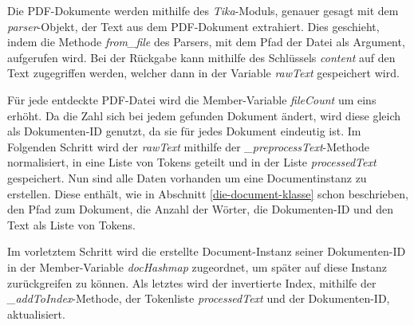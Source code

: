  Die PDF-Dokumente werden mithilfe des \textit{Tika}-Moduls, genauer gesagt mit dem \textit{parser}-Objekt, der Text aus dem PDF-Dokument extrahiert. Dies geschieht, indem die Methode \textit{from\_file} des Parsers, mit dem Pfad der Datei als Argument, aufgerufen wird. Bei der Rückgabe kann mithilfe des Schlüssels \textit{content} auf den Text zugegriffen werden, welcher dann in der Variable \textit{rawText} gespeichert wird.

Für jede entdeckte PDF-Datei wird die Member-Variable \textit{fileCount} um eins erhöht. Da die Zahl sich bei jedem gefunden Dokument ändert, wird diese gleich als Dokumenten-ID genutzt, da sie für jedes Dokument eindeutig ist. Im Folgenden Schritt wird der \textit{rawText} mithilfe der \textit{\_preprocessText}-Methode normalisiert, in eine Liste von Tokens geteilt und in der Liste \textit{processedText} gespeichert. Nun sind alle Daten vorhanden um eine Documentinstanz zu erstellen. Diese enthält, wie in Abschnitt \ref{die-document-klasse} schon beschrieben, den Pfad zum Dokument, die Anzahl der Wörter, die Dokumenten-ID und den Text als Liste von Tokens.

Im vorletztem Schritt wird die erstellte Document-Instanz seiner Dokumenten-ID in der Member-Variable \textit{docHashmap} zugeordnet, um später auf diese Instanz zurückgreifen zu können. Als letztes wird der invertierte Index, mithilfe der \textit{\_addToIndex}-Methode, der Tokenliste \textit{processedText} und der Dokumenten-ID, aktualisiert.

